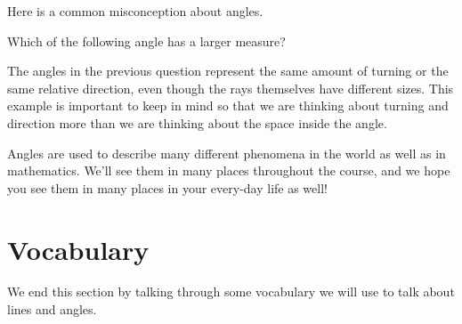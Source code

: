 \documentclass{ximera}
\begin{document}



Here is a common misconception about angles.
\begin{question}
Which of the following angle has a larger measure?
\begin{image}
\end{image}

\begin{multipleChoice}
\end{multipleChoice}
\end{question}
The angles in the previous question represent the same amount of turning or the same relative direction, even though the rays themselves have different sizes. This example is important to keep in mind so that we are thinking about turning and direction more than we are thinking about the space inside the angle.

Angles are used to describe many different phenomena in the world as well as in mathematics. We'll see them in many places throughout the course, and we hope you see them in many places in your every-day life as well!

\section{Vocabulary}

We end this section by talking through some vocabulary we will use to talk about lines and angles.
\end{document}
